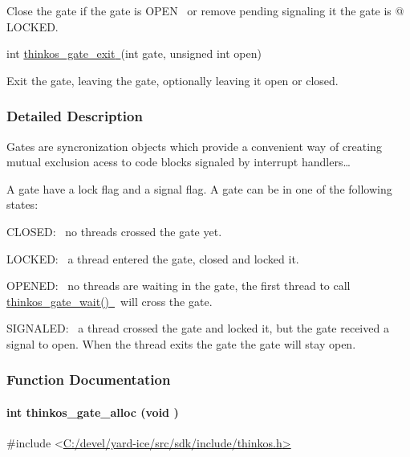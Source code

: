 {{Close the gate if the gate is }{OPEN}{~ or remove pending signaling it
the gate is @ LOCKED. }

{int
}{\protect\hyperlink{h.2r0uhxc}{thinkos\_gate\_exit}}{\protect\hyperlink{h.2r0uhxc}{~}}{(int
gate, unsigned int open)}

{Exit the gate, leaving the gate, optionally leaving it open or closed.
}

{}

\subsubsection{\texorpdfstring{{Detailed
Description}}{Detailed Description}}\label{detailed-description-7}

{Gates are syncronization objects which provide a convenient way of
creating mutual exclusion acess to code blocks signaled by interrupt
handlers\ldots{}}

{A gate have a lock flag and a signal flag. A gate can be in one of the
following states:}

{CLOSED:}{~ no threads crossed the gate yet.}

{LOCKED:}{~ a thread entered the gate, closed and locked it.}

{OPENED:}{~ no threads are waiting in the gate, the first thread to call
}{\protect\hyperlink{h.2dlolyb}{thinkos\_gate\_wait()}}{\protect\hyperlink{h.2dlolyb}{~}}{~will
cross the gate.}

{SIGNALED:}{~ a thread crossed the gate and locked it, but the gate
received a signal to open. When the thread exits the gate the gate will
stay open. }

{}

\subsubsection{\texorpdfstring{{Function
Documentation}}{Function Documentation}}\label{function-documentation-7}

\paragraph{\texorpdfstring{{int thinkos\_gate\_alloc (void
)}}{int thinkos\_gate\_alloc (void )}}\label{int-thinkos_gate_alloc-void}

{}

{\#include
\textless{}}{\protect\hyperlink{h.pkwqa1}{C:/devel/yard-ice/src/sdk/include/thinkos.h}}{\protect\hyperlink{h.pkwqa1}{\textgreater{}}}

}
